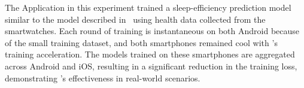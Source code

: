 The \fedcampus Application in this experiment trained a sleep-efficiency
prediction model similar to the model described in~\cite{khoa2022fedmcrnn}
using health data collected from the smartwatches.
Each round of training is instantaneous on both Android because of
the small training dataset,
and both smartphones remained cool with \fedkit's training acceleration.
The models trained on these smartphones are aggregated across Android and iOS,
resulting in a significant reduction in the training loss,
demonstrating \fedkit's effectiveness in real-world scenarios.

